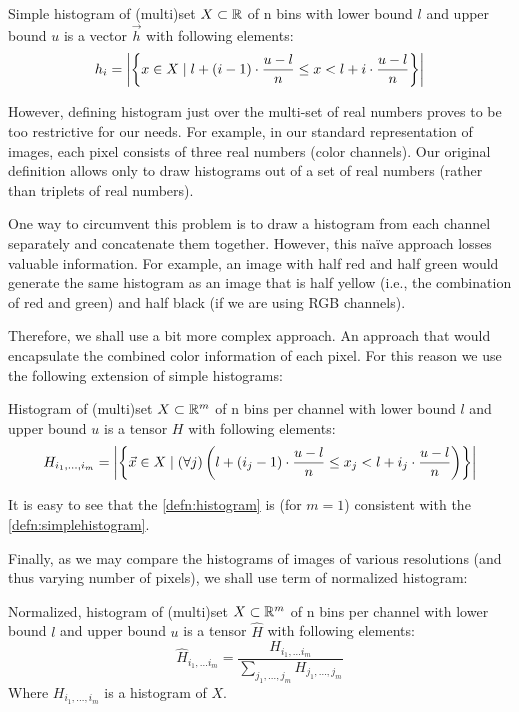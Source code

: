 \begin{defn}
\label{defn:simplehistogram}
Simple histogram of (multi)set $X \subset \mathbb{R}$ of n bins with lower bound $l$ and upper bound
$u$ is a vector $\vec{h}$ with following elements:
$$h_i = \left|{\left\{x \in X \mid l + (i-1) \cdot \frac{u-l}{n} \leq x < l + i \cdot \frac{u-l}{n}\right\}}\right|$$
\end{defn}

However, defining histogram just over the multi-set of real numbers proves to be too restrictive for our needs. For example, in our standard representation of images, each pixel consists of three real numbers (color channels). Our original definition allows only to draw histograms out of a set of real numbers (rather than triplets of real numbers).

One way to circumvent this problem is to draw a histogram from each channel separately and concatenate them together. However, this naïve approach losses valuable information. For example, an image with half red and half green would generate the same histogram as an image that is half yellow (i.e., the combination of red and green) and half black (if we are using RGB channels).

Therefore, we shall use a bit more complex approach. An approach that would encapsulate the combined color information of each pixel. For this reason we use the following extension of simple histograms:

\begin{defn}
\label{defn:histogram}
Histogram of (multi)set $X \subset \mathbb{R}^m$ of n bins per channel with lower bound
$l$ and upper bound $u$ is a tensor $H$ with following elements:
$$H_{i_1, \ldots, i_m} = \left|{\left\{\vec{x} \in X \mid (\forall j) \left(l + (i_j-1) \cdot \frac{u-l}{n} \leq x_j < l + i_j \cdot \frac{u-l}{n}\right)\right\}}\right|$$
\end{defn}

It is easy to see that the \autoref{defn:histogram} is (for $m = 1$)
consistent with the \autoref{defn:simplehistogram}.

Finally, as we may compare the histograms of images of various resolutions (and thus varying number of pixels), we shall use term of normalized histogram:

\begin{defn}
\label{defn:normhistogram}
Normalized, histogram of (multi)set $X \subset \mathbb{R}^m$ of n bins per channel with
lower bound $l$ and upper bound $u$ is a tensor $\widehat{H}$ with following
elements:
$$\widehat{H}_{i_1, \ldots i_m} = \frac{H_{i_1, \ldots i_m}}{\sum_{j_1, \ldots, j_m} H_{j_1, \ldots, j_m}}$$
Where $H_{i_1, \ldots, i_m}$ is a histogram of $X$.
\end{defn}

